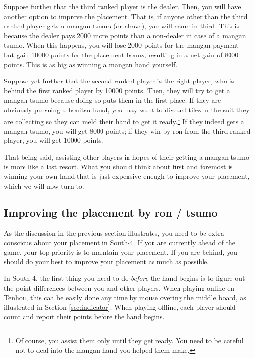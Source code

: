 \bigskip
Suppose further that the third ranked player is the dealer. Then, you will have another option to improve the placement. That is, if anyone other than the third ranked player gets a {\jap mangan tsumo} (or above), you will come in third. This is because the dealer pays 2000 more points than a non-dealer in case of a {\jap mangan tsumo}. When this happens, you will lose 2000 points for the {\jap mangan} payment but gain 10000 points for the placement bonus, resulting in a net gain of 8000 points. This is as big as winning a {\jap mangan} hand yourself.

\bigskip
Suppose yet further that the second ranked player is the right player, who is behind the first ranked player by 10000 points. Then, they will try to get a {\jap mangan tsumo} because doing so puts them in the first place. If they are obviously pursuing a {\jap honitsu} hand, you may want to discard tiles in the suit they are collecting so they can meld their hand to get it ready.\footnote{Of course, you assist them only until they get ready. You need to be careful not to deal into the {\jap mangan} hand you helped them make.} If they indeed gets a {\jap mangan tsumo}, you will get 8000 points; if they win by {\jap ron} from the third ranked player, you will get 10000 points. 

\bigskip
That being said, assisting other players in hopes of their getting a {\jap mangan tsumo} is more like a last resort. What you should think about first and foremost is winning your own hand that is just expensive enough to improve your placement, which we will now turn to.

\subsection*{Improving the placement by {\jap ron} / {\jap tsumo}}
As the discussion in the previous section illustrates, you need to be extra conscious about your placement in South-4. If you are currently ahead of the game, your top priority is to maintain your placement. If you are behind, you should do your best to improve your placement as much as possible. 

\bigskip
In South-4, the first thing you need to do \emph{before} the hand begins is to figure out the point differences between you and other players. When playing online on {\jap Tenhou}, this can be easily done any time by mouse overing the middle board, as illustrated in Section \ref{sec:indicator}. When playing offline, each player should count and report their points before the hand begins. 

